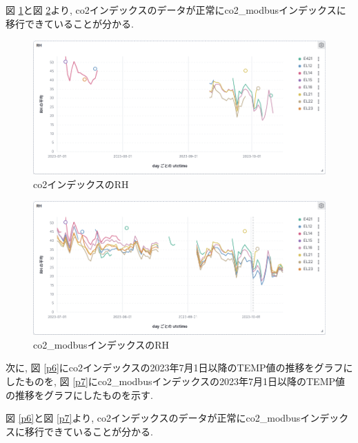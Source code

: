 \documentclass[a4j,12pt,]{jarticle}
\begin{document}
図 \ref{p4}と図 \ref{p5}より, co2インデックスのデータが正常にco2\_modbusインデックスに移行できていることが分かる.

\begin{figure}[H]
  \begin{center}
    \includegraphics[width=160mm]{co2RH.png}
    \caption{co2インデックスのRH}
    \label{p4}
  \end{center}
\end{figure}

\begin{figure}[H]
  \begin{center}
    \includegraphics[width=160mm]{co2ModbusRH.png}
    \caption{co2\_modbusインデックスのRH}
    \label{p5}
  \end{center}
\end{figure}

次に, 図 \ref{p6}にco2インデックスの2023年7月1日以降のTEMP値の推移をグラフにしたものを, 図 \ref{p7}にco2\_modbusインデックスの2023年7月1日以降のTEMP値の推移をグラフにしたものを示す.

図 \ref{p6}と図 \ref{p7}より, co2インデックスのデータが正常にco2\_modbusインデックスに移行できていることが分かる.
\end{document}
